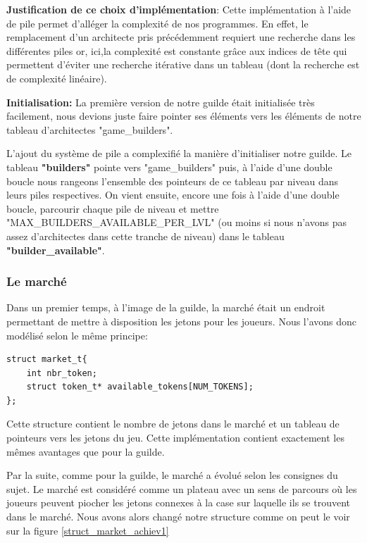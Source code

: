 \documentclass{article}
\begin{document}
        \vspace{1em}
        
        \textbf{Justification de ce choix d'implémentation}: Cette implémentation à l'aide de pile permet d'alléger la complexité de nos programmes. En effet, le remplacement d'un architecte pris précédemment requiert une recherche dans les différentes piles or, ici,la complexité est constante grâce aux indices de tête qui permettent d'éviter une recherche itérative dans un tableau (dont la recherche est de complexité linéaire).

        \vspace{1em} \textbf{Initialisation:} La première version de notre guilde était initialisée très facilement, nous devions juste faire pointer ses éléments vers les éléments de notre tableau d'architectes "game\_builders".
        
        L'ajout du système de pile a complexifié la manière d'initialiser notre guilde. Le tableau \textbf{"builders"} pointe vers "game\_builders" puis, à l'aide d'une double boucle nous rangeons l'ensemble des pointeurs de ce tableau par niveau dans leurs piles respectives. On vient ensuite, encore une fois à l'aide d'une double boucle, parcourir chaque pile de niveau et mettre "MAX\_BUILDERS\_AVAILABLE\_PER\_LVL" (ou moins si nous n'avons pas assez d'architectes dans cette tranche de niveau)  dans le tableau \textbf{"builder\_available"}.
        \subsubsection{Le marché} Dans un premier temps, à l'image de la guilde, la marché était un endroit permettant de mettre à disposition les jetons pour les joueurs. Nous l'avons donc modélisé selon le même principe:


\begin{lstlisting}[frame=single, caption={Code la structure de notre marché},label={struct_market_achiev0}]
struct market_t{
    int nbr_token;
    struct token_t* available_tokens[NUM_TOKENS];
};

    \end{lstlisting}
      

        Cette structure contient le nombre de jetons dans le marché et un tableau de pointeurs vers les jetons du jeu. Cette implémentation contient exactement les mêmes avantages que pour la guilde.

        Par la suite, comme pour la guilde, le marché a évolué selon les consignes du sujet. Le marché est considéré comme un plateau avec un sens de parcours où les joueurs peuvent piocher les jetons connexes à la case sur laquelle ils se trouvent dans le marché. Nous avons alors changé notre structure comme on peut le voir sur la figure \ref{struct_market_achiev1}
\end{document}

